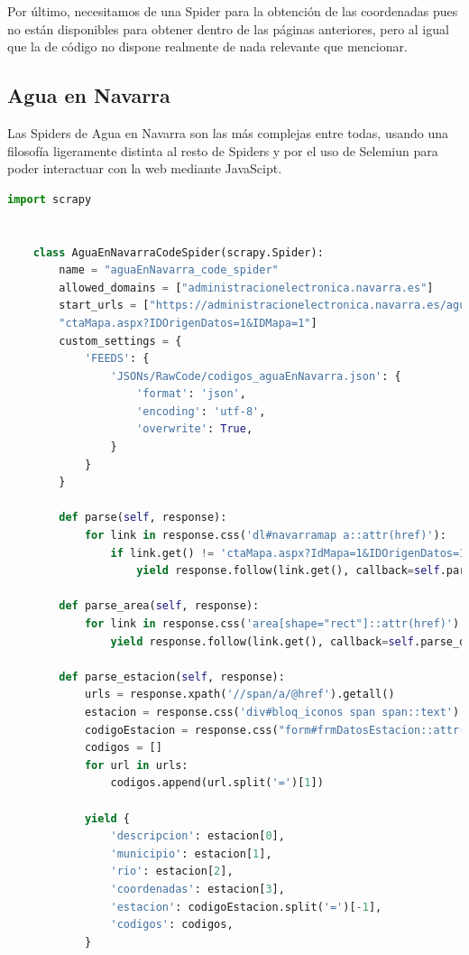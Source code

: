 Por último, necesitamos de una Spider para la obtención de las coordenadas pues no están disponibles para obtener dentro de las páginas anteriores, pero al igual que la de código no dispone realmente de nada relevante que mencionar.

\subsection{Agua en Navarra}
Las Spiders de Agua en Navarra son las más complejas entre todas, usando una filosofía ligeramente distinta al resto de Spiders y por el uso de Selemiun para poder interactuar con la web mediante JavaScipt.

\begin{lstlisting}[language=Python, caption={Agua en Navarra Code Spider}]
	import scrapy
	
	
	class AguaEnNavarraCodeSpider(scrapy.Spider):
		name = "aguaEnNavarra_code_spider"
		allowed_domains = ["administracionelectronica.navarra.es"]
		start_urls = ["https://administracionelectronica.navarra.es/aguaEnNavarra/"
		"ctaMapa.aspx?IDOrigenDatos=1&IDMapa=1"]
		custom_settings = {
			'FEEDS': {
				'JSONs/RawCode/codigos_aguaEnNavarra.json': {
					'format': 'json',
					'encoding': 'utf-8',
					'overwrite': True,
				}
			}
		}
		
		def parse(self, response):
			for link in response.css('dl#navarramap a::attr(href)'):
				if link.get() != 'ctaMapa.aspx?IdMapa=1&IDOrigenDatos=1':
					yield response.follow(link.get(), callback=self.parse_area)
		
		def parse_area(self, response):
			for link in response.css('area[shape="rect"]::attr(href)'):
				yield response.follow(link.get(), callback=self.parse_data)
		
		def parse_estacion(self, response):
			urls = response.xpath('//span/a/@href').getall()
			estacion = response.css('div#bloq_iconos span span::text').getall()
			codigoEstacion = response.css("form#frmDatosEstacion::attr(action)").get()
			codigos = []
			for url in urls:
				codigos.append(url.split('=')[1])
			
			yield {
				'descripcion': estacion[0],
				'municipio': estacion[1],
				'rio': estacion[2],
				'coordenadas': estacion[3],
				'estacion': codigoEstacion.split('=')[-1],
				'codigos': codigos,
			}
\end{lstlisting}

